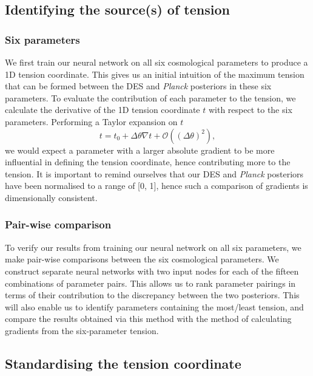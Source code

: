 \documentclass[%
 reprint,
 amsmath,amssymb,
 aps,
]{revtex4-2}
\begin{document}
\subsection{Identifying the source(s) of tension} \label{section:source}

\subsubsection{Six parameters}

We first train our neural network on all six cosmological parameters to produce a 1D tension coordinate. This gives us an initial intuition of the maximum tension that can be formed between the DES and \textit{Planck} posteriors in these six parameters. To evaluate the contribution of each parameter to the tension, we calculate the derivative of the 1D tension coordinate $t$ with respect to the six parameters. Performing a Taylor expansion on $t$
\begin{equation}
    t = t_0 + \Delta \theta \nabla t + \mathcal{O}((\Delta \theta)^2),
\end{equation}
we would expect a parameter with a larger absolute gradient to be more influential in defining the tension coordinate, hence contributing more to the tension. It is important to remind ourselves that our DES and \textit{Planck} posteriors have been normalised to a range of [0, 1], hence such a comparison of gradients is dimensionally consistent.

\subsubsection{Pair-wise comparison}

To verify our results from training our neural network on all six parameters, we make pair-wise comparisons between the six cosmological parameters. We construct separate neural networks with two input nodes for each of the fifteen combinations of parameter pairs. This allows us to rank parameter pairings in terms of their contribution to the discrepancy between the two posteriors. This will also enable us to identify parameters containing the most/least tension, and compare the results obtained via this method with the method of calculating gradients from the six-parameter tension.


\subsection{Standardising the tension coordinate}
\end{document}
